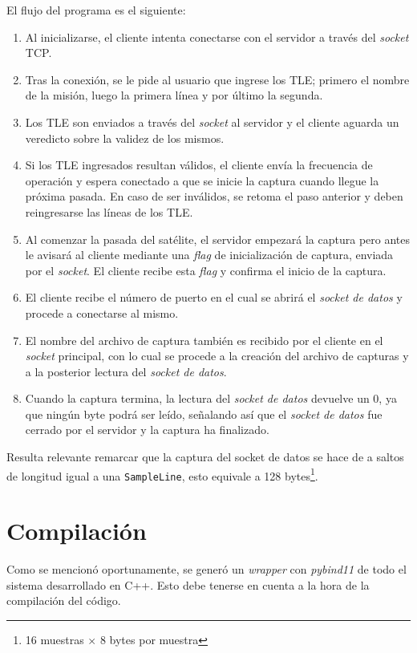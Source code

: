 \documentclass[../../main.tex]{subfiles}
\begin{document}
El flujo del programa es el siguiente:
\begin{enumerate}
    \item Al inicializarse, el cliente intenta conectarse con el servidor a través del \textit{socket} TCP.
    \item Tras la conexión, se le pide al usuario que ingrese los TLE; primero el nombre de la misión, luego la primera línea y por último la segunda.
    \item Los TLE son enviados a través del \textit{socket} al servidor y el cliente aguarda un veredicto sobre la validez de los mismos.
    \item Si los TLE ingresados resultan válidos, el cliente envía la frecuencia de operación y espera conectado a que se inicie la captura cuando llegue la próxima pasada. En caso de ser inválidos, se retoma el paso anterior y deben reingresarse las líneas de los TLE.
    \item Al comenzar la pasada del satélite, el servidor empezará la captura pero antes le avisará al cliente mediante una \textit{flag} de inicialización de captura, enviada por el \textit{socket}. El cliente recibe esta \textit{flag} y confirma el inicio de la captura.
    \item El cliente recibe el número de puerto en el cual se abrirá el \textit{socket de datos} y procede a conectarse al mismo.
    \item El nombre del archivo de captura también es recibido por el cliente en el \textit{socket} principal, con lo cual se procede a la creación del archivo de capturas y a la posterior lectura del \textit{socket de datos}.
    \item Cuando la captura termina, la lectura del \textit{socket de datos} devuelve un 0, ya que ningún byte podrá ser leído, señalando así que el \textit{socket de datos} fue cerrado por el servidor y la captura ha finalizado.
\end{enumerate}

Resulta relevante remarcar que la captura del socket de datos se hace de a saltos de longitud igual a una \texttt{SampleLine}, esto equivale a 128 bytes\footnote{16 muestras $\times$ 8 bytes por muestra}.

\section{Compilación}
Como se mencionó oportunamente, se generó un \textit{wrapper} con \textit{pybind11} de todo el sistema desarrollado en C++. Esto debe tenerse en cuenta a la hora de la compilación del código.
\end{document}
